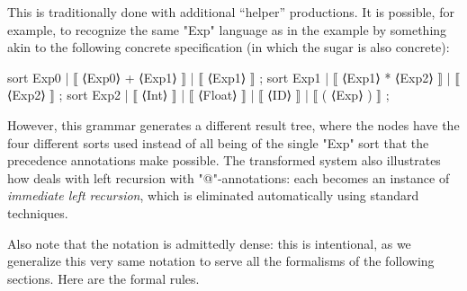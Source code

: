 \documentclass[11pt]{article} %
\begin{document}
{\small\begin{remark} This is traditionally done with additional ``helper'' productions. It is
    possible, for example, to recognize the same "Exp" language as in the example by something akin
    to the following concrete \HAX specification (in which the sugar is also concrete):
\begin{hacs}[xleftmargin=\parindent]
sort Exp0 | ⟦ ⟨Exp0⟩ + ⟨Exp1⟩ ⟧ | ⟦ ⟨Exp1⟩ ⟧ ;
sort Exp1 | ⟦ ⟨Exp1⟩ * ⟨Exp2⟩ ⟧ | ⟦ ⟨Exp2⟩ ⟧ ;
sort Exp2 | ⟦ ⟨Int⟩ ⟧ | ⟦ ⟨Float⟩ ⟧ | ⟦ ⟨ID⟩ ⟧ | ⟦ ( ⟨Exp⟩ ) ⟧ ;
\end{hacs}%
However, this grammar generates a different result tree, where the nodes have the four different
sorts used instead of all being of the single "Exp" sort that the precedence annotations make
possible.  The transformed system also illustrates how \HAX deals with left recursion with
"@"-annotations: each becomes an instance of \emph{immediate left recursion}, which is eliminated
automatically using standard techniques.
\end{remark}}

Also note that the notation is admittedly dense: this is intentional, as we generalize this very
same notation to serve all the formalisms of the following sections.  Here are the formal rules.
\end{document}
